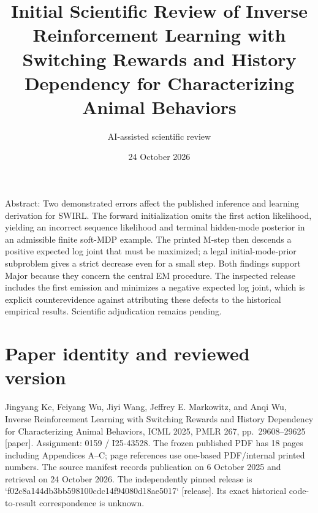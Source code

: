 \documentclass[10pt]{article}
\title{Initial Scientific Review of
Inverse Reinforcement Learning with Switching Rewards and History Dependency for Characterizing Animal Behaviors}
\author{AI-assisted scientific review}
\date{24 October 2026}
\begin{document}
\maketitle
Abstract: Two demonstrated errors affect the published inference and learning derivation for SWIRL. The forward initialization omits the first action likelihood, yielding an incorrect sequence likelihood and terminal hidden-mode posterior in an admissible finite soft-MDP example. The printed M-step then descends a positive expected log joint that must be maximized; a legal initial-mode-prior subproblem gives a strict decrease even for a small step. Both findings support Major because they concern the central EM procedure. The inspected release includes the first emission and minimizes a negative expected log joint, which is explicit counterevidence against attributing these defects to the historical empirical results. Scientific adjudication remains pending.\par
\section*{Paper identity and reviewed version}
Jingyang Ke, Feiyang Wu, Jiyi Wang, Jeffrey E. Markowitz, and Anqi Wu, Inverse Reinforcement Learning with Switching Rewards and History Dependency for Characterizing Animal Behaviors, ICML 2025, PMLR 267, pp. 29608–29625 [paper]. Assignment: 0159 / I25-43528. The frozen published PDF has 18 pages including Appendices A–C; page references use one-based PDF/internal printed numbers. The source manifest records publication on 6 October 2025 and retrieval on 24 October 2026. The independently pinned release is `f02c8a144db3bb598100cdc14f94080d18ae5017` [release]. Its exact historical code-to-result correspondence is unknown.\par
\end{document}
